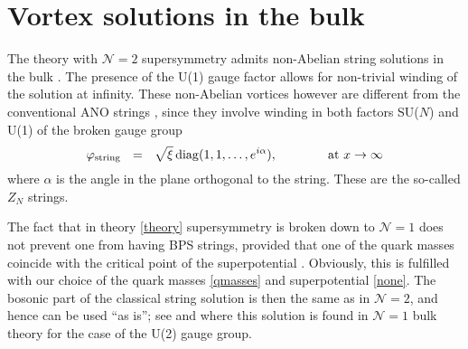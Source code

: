 \documentclass[12pt]{article}
\newcommand{\ntwo}{${\mathcal N}=2$ }
\newcommand{\ntwon}{${\mathcal N}=2$}
\newcommand{\none}{${\mathcal N}=1$ }
\begin{document}
%
%
\section{Vortex solutions in the bulk}
\label{vortex}
\setcounter{equation}{0}

	The theory with \ntwo supersymmetry admits non-Abelian string solutions in the bulk
\cite{HT1,ABEKY,SYmon,HT2}.
	The presence of the U(1) gauge factor allows for non-trivial winding of the solution
	at infinity.
	These non-Abelian vortices however are different from the conventional ANO strings \cite{ANO}, 
	since they involve winding in both factors SU($N$) and U(1) of the broken gauge group
\[
	\varphi_{\rm string} ~~=~~ \sqrt{\xi}\,{\rm diag}(1, 1, \dots, e^{i\alpha}), 
		\qquad\qquad \text{at $x \to \infty$}
\]
	where $ \alpha $ is the angle in the plane orthogonal to the string.
	These are the so-called $ Z_N $ strings.

	The fact that in theory \eqref{theory} supersymmetry is broken down to \none does not prevent
	one from having BPS strings, provided that one of the quark masses 
	coincide with the critical point of the superpotential \cite{Edalati}.
	Obviously, this is fulfilled with our choice of the quark masses \eqref{qmasses} and superpotential
	\eqref{none}.
	The bosonic part of the classical string solution is then the same as in \ntwon, and hence can
	be used ``as is'';
	 see  \cite{SYrev} and \cite{SYhet} where this solution
is found in \none bulk theory for the case of the U(2) gauge group.
\end{document}
